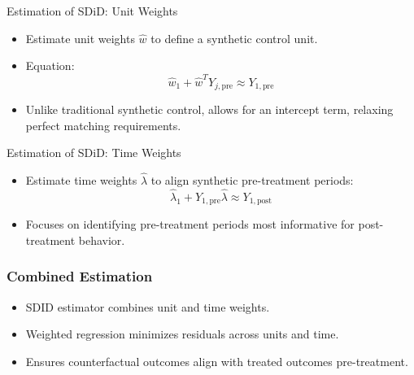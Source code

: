 \documentclass{beamer}
\begin{document}
\begin{frame}{Estimation of SDiD: Unit Weights}

\begin{itemize}
    \item Estimate unit weights \(\widehat{w}\) to define a synthetic control unit.
    \item Equation: 
    \[
    \widehat{w}_1 + \widehat{w}^T Y_{j,\text{pre}} \approx Y_{1,\text{pre}}
    \]
    \item Unlike traditional synthetic control, allows for an intercept term, relaxing perfect matching requirements.
\end{itemize}

\end{frame}

\begin{frame}{Estimation of SDiD: Time Weights}

\begin{itemize}
    \item Estimate time weights \(\widehat{\lambda}\) to align synthetic pre-treatment periods:
    \[
    \widehat{\lambda}_1 + Y_{1,\text{pre}} \widehat{\lambda} \approx Y_{1,\text{post}}
    \]
    \item Focuses on identifying pre-treatment periods most informative for post-treatment behavior.
\end{itemize}

\end{frame}



\begin{frame}
\frametitle{Combined Estimation}

\begin{itemize}
    \item SDID estimator combines unit and time weights.
    \item Weighted regression minimizes residuals across units and time.
    \item Ensures counterfactual outcomes align with treated outcomes pre-treatment.
\end{itemize}

\end{frame}
\end{document}
